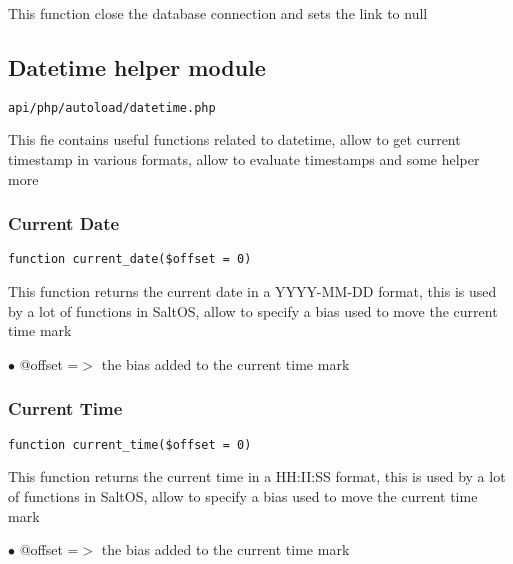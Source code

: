 \documentclass[a4paper]{article}
\begin{document}
This function close the database connection and sets the link to null

\hypertarget{toc96}{}
\subsection{Datetime helper module}

\begin{lstlisting}
api/php/autoload/datetime.php
\end{lstlisting}

This fie contains useful functions related to datetime, allow to get current timestamp in various
formats, allow to evaluate timestamps and some helper more

\hypertarget{toc97}{}
\subsubsection{Current Date}

\begin{lstlisting}
function current_date($offset = 0)
\end{lstlisting}

This function returns the current date in a YYYY-MM-DD format, this is used
by a lot of functions in SaltOS, allow to specify a bias used to move the
current time mark

\begin{compactitem}
\item[\color{myblue}$\bullet$] @offset =$>$ the bias added to the current time mark
\end{compactitem}

\hypertarget{toc98}{}
\subsubsection{Current Time}

\begin{lstlisting}
function current_time($offset = 0)
\end{lstlisting}

This function returns the current time in a HH:II:SS format, this is used
by a lot of functions in SaltOS, allow to specify a bias used to move the
current time mark

\begin{compactitem}
\item[\color{myblue}$\bullet$] @offset =$>$ the bias added to the current time mark
\end{compactitem}
\end{document}
